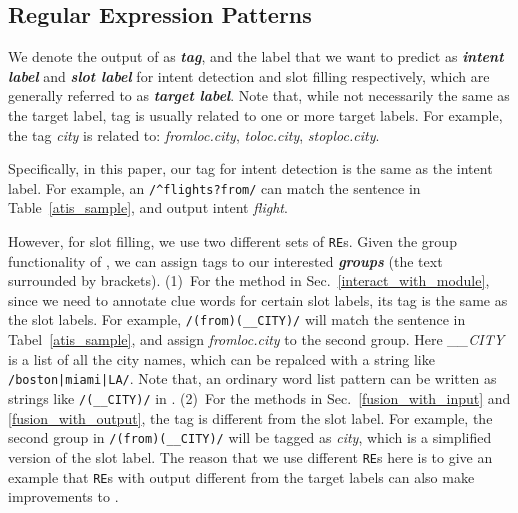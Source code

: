\subsection{Regular Expression Patterns}
\label{re_desc}
We denote the output of \RE as \textbf{\emph{\RE tag}}, and the label that we want to predict as \textbf{\emph{intent label}} and \textbf{\emph{slot label}} for intent detection and slot filling respectively, which are generally referred to as \textbf{\emph{target label}}.
Note that, while not necessarily the same as the target label, \RE tag is usually related to one or more target labels. For example, the \RE tag \emph{city} is related to: \emph{fromloc.city}, \emph{toloc.city}, \emph{stoploc.city}.

Specifically, in this paper, our \RE tag for intent detection is the same as the intent label. For example, an \RE
\texttt{/\textasciicircum flights?\:from/} can match the sentence in Table~\ref{atis_sample}, and output intent \emph{flight}.

However, for slot filling, we use two different sets of \texttt{RE}s.
Given the group functionality of \RE, we can assign tags to our interested \textbf{\emph{\RE groups}} (the text surrounded by brackets).
(1)~For the method in Sec.~\ref{interact_with_module}, since we need to annotate clue words for certain slot labels, its \RE tag is the same as the slot labels.
For example, \texttt{/(from)\:(\_\_CITY)/} will match the sentence in Tabel~\ref{atis_sample}, and assign \emph{fromloc.city} to the second \RE group.
Here \emph{\_\_CITY} is a list of all the city names, which can be repalced with a string like \texttt{/boston|miami|LA/}.
Note that, an ordinary word list pattern can be written as strings like \texttt{/(\_\_CITY)/} in \RE.
(2)~For the methods in Sec.~\ref{fusion_with_input} and \ref{fusion_with_output}, the \RE tag is different from the slot label. For example, the second \RE group in \texttt{/(from)\:(\_\_CITY)/} will be tagged as \emph{city}, which is a simplified version of the slot label. The reason that we use different \texttt{RE}s here is to give an example that \texttt{RE}s with output different from the target labels can also make improvements to \NN.


